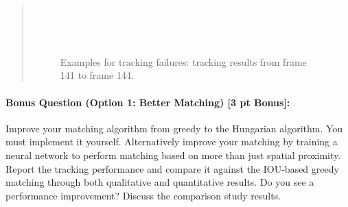 \documentclass[11pt]{article}
\begin{document}
\begin{quote}
\begin{figure}[h]
    \centering
     \\
     \\
     \\
    \caption{Examples for tracking failures: tracking results from frame 141 to frame 144.}
    \label{fig:q7-2}
\end{figure}

\end{quote}

\paragraph{Bonus Question (Option 1: Better Matching) [3 pt Bonus]:}
Improve your matching algorithm from greedy to the Hungarian algorithm. You must implement it yourself. Alternatively improve your matching by training a neural network to perform matching based on more than just spatial proximity. Report the tracking performance and compare it against the IOU-based greedy matching through both qualitative and quantitative results. Do you see a performance improvement? Discuss the comparison study results.
\end{document}
